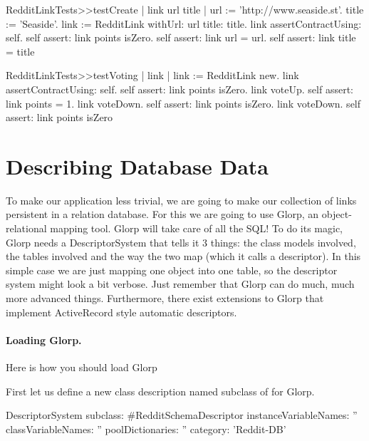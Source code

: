 \documentclass[a4paper,10pt,twoside]{book}
\begin{document}
\begin{code}{}
RedditLinkTests>>testCreate
    | link url title | 
    url := 'http://www.seaside.st'. 
    title := 'Seaside'. 
    link := RedditLink withUrl: url title: title. 
    link assertContractUsing: self. 
    self assert: link points isZero. 
    self assert: link url = url. 
    self assert: link title = title
\end{code}

\begin{code}{}
RedditLinkTests>>testVoting
    | link | 
    link := RedditLink new. 
    link assertContractUsing: self. 
    self assert: link points isZero. link voteUp. 
    self assert: link points = 1. 
    link voteDown. self assert: 
    link points isZero. 
    link voteDown. 
    self assert: link points isZero
\end{code}


\section{Describing Database Data}

To make our application less trivial, we are going to make our collection of links persistent in a relation database. For this we are going to use Glorp, an object-relational mapping tool. Glorp will take care of all the SQL! To do its magic, Glorp needs a DescriptorSystem that tells it 3 things: the class models involved, the tables involved and the way the two map (which it calls a descriptor). In this simple case we are just mapping one object into one table, so the descriptor system might look a bit verbose. Just remember that Glorp can do much, much more advanced things. Furthermore, there exist extensions to Glorp that implement ActiveRecord style automatic descriptors.

\paragraph{Loading Glorp.}
Here is how you should load Glorp 


First let us define a new class description named  subclass of   for Glorp.

\begin{code}{}
DescriptorSystem subclass: #RedditSchemaDescriptor
   instanceVariableNames: '' 
   classVariableNames: '' 
   poolDictionaries: '' 
   category: 'Reddit-DB'
\end{code}
\end{document}
